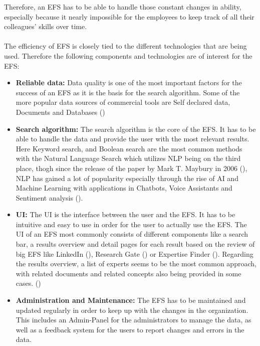 Therefore, an \ac{EFS} has to be able to handle those constant changes in ability, especially because it nearly impossible for the employees to keep track of all their 
colleagues’ skills over time.
\\ \\
The efficiency of \ac{EFS} is closely tied to the different technologies that are being used. Therefore the following components and technologies are of interest for the \ac{EFS}:
\begin{itemize}
    \item \textbf{Reliable data:} Data quality is one of the most important factors for the success of an \ac{EFS} as it is the basis for the search algorithm. Some of the
    more popular data sources of commercial tools are Self declared data, Documents and Databases (\cite[page 18]{maybury_expert_2006})
    \item \textbf{Search algorithm:} The search algorithm is the core of the \ac{EFS}. It has to be able to handle the data and provide the user with the most relevant 
    results. Here Keyword search, and Boolean search are the most common methods with the Natural Language Search which utilizes \ac{NLP} being on the third place,
    thogh since the release of the paper by Mark T. Maybury in 2006 (\cite[page 18]{maybury_expert_2006}), \ac{NLP} has gained a lot of popularity especially 
    through the rise of \ac{AI} and Machine Learning with applications in Chatbots, Voice Assistants and Sentiment analysis (\cite{administrator_role_2023}).
    \item \textbf{\ac{UI}:} The \ac{UI} is the interface between the user and the \ac{EFS}. It has to be intuitive and easy to use in order for the user to actually use the \ac{EFS}.
    The \ac{UI} of an \ac{EFS} most commonly consists of different components like a search bar, a results overview and detail pages for each result based on the review of big 
    \ac{EFS} like LinkedIn (\cite{noauthor_linkedin_nodate}), Research Gate (\cite{noauthor_researchgate_nodate}) or Expertise Finder (\cite{noauthor_expertise_nodate-1}). 
    Regarding the results overview, a list of experts seems to be the most common approach, with related documents and related concepts also being provided in some 
    cases. (\cite[page 18]{maybury_expert_2006})
    \item \textbf{Administration and Maintenance:} The \ac{EFS} has to be maintained and updated regularly in order to keep up with the changes in the organization. This includes an 
    Admin-Panel for the administrators to manage the data, as well as a feedback system for the users to report changes and errors in the data.

\end{itemize}

